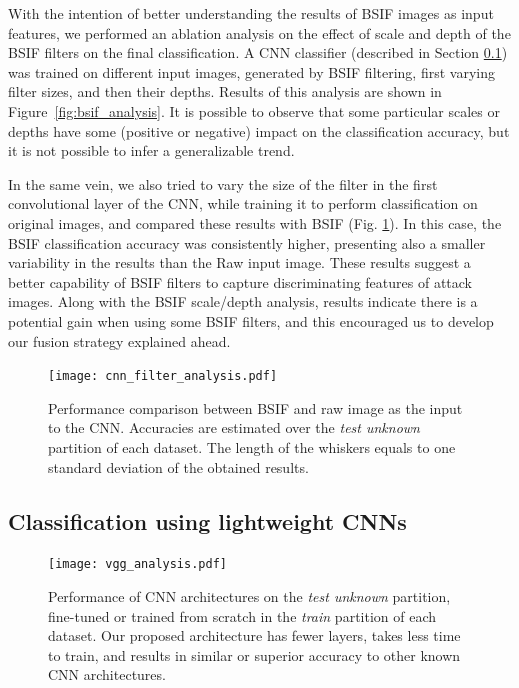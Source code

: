 With the intention of better understanding the results of BSIF images as input features, we performed an ablation analysis on the effect of scale and depth of the BSIF filters on the final classification. A CNN classifier (described in Section \ref{sec:our_cnn}) was trained on different input images, generated by BSIF filtering, first varying filter sizes, and then their depths. Results of this analysis are shown in Figure~\ref{fig:bsif_analysis}. It is possible to observe that some particular scales or depths have some (positive or negative) impact on the classification accuracy, but it is not possible to infer a generalizable trend.

In the same vein, we also tried to vary the size of the filter in the first convolutional layer of the CNN, while training it to perform classification on original images, and compared these results with BSIF (Fig. \ref{fig:cnn_analysis}). In this case, the BSIF classification accuracy was consistently higher, presenting also a smaller variability in the results than the Raw input image. These results suggest a better capability of BSIF filters to capture discriminating features of attack images. Along with the BSIF scale/depth analysis, results  indicate there is a potential gain when using some BSIF filters, and this  encouraged us to develop our fusion strategy explained ahead.

%
\begin{figure}[!htb]
    \centering
    \texttt{[image: cnn\_filter\_analysis.pdf]}
    \caption{Performance comparison between BSIF and raw image as the input to the CNN. Accuracies are estimated over the \emph{test unknown} partition of each dataset. The length of the whiskers equals to one standard deviation of the obtained results.}
    \label{fig:cnn_analysis}
\end{figure}



\subsection{Classification using lightweight CNNs}
\label{sec:our_cnn}

%
\begin{figure}[!htb]
    \centering
    \texttt{[image: vgg\_analysis.pdf]}
    \caption{Performance of CNN architectures on the \emph{test unknown} partition, fine-tuned or trained from scratch in the \emph{train} partition of each dataset. Our proposed architecture has fewer layers, takes less time to train, and results in similar or superior accuracy to other known CNN architectures.}
    \label{fig:other_cnns}
\end{figure}

